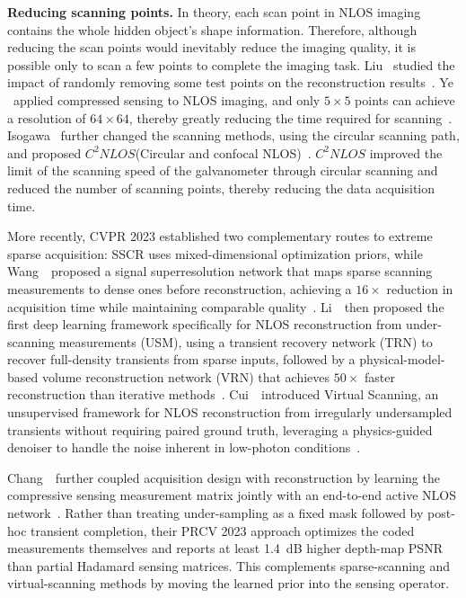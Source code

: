\vspace{0.8mm}
\noindent \textbf{Reducing scanning points.}
In theory, each scan point in NLOS imaging contains the whole hidden object's shape information. Therefore, although reducing the scan points would inevitably reduce the imaging quality, it is possible only to scan a few points to complete the imaging task. Liu \etal~studied the impact of randomly removing some test points on the reconstruction results~\cite{liuRoleWignerDistribution2020}. Ye \etal~applied compressed sensing to NLOS imaging, and only $5\times 5$ points can achieve a resolution of $64\times 64$,  thereby greatly reducing the time required for scanning~\cite{yeCompressedSensingActive2021}. Isogawa \etal~further changed the scanning methods, using the circular scanning path, and proposed $C^2NLOS$(Circular and confocal NLOS)~\cite{isogawaEfficientNonLineofSightImaging}. $C^2NLOS$ improved the limit of the scanning speed of the galvanometer through circular scanning and reduced the number of scanning points, thereby reducing the data acquisition time.

More recently, CVPR 2023 established two complementary routes to extreme sparse acquisition: SSCR uses mixed-dimensional optimization priors, while Wang~\etal~proposed a signal superresolution network that maps sparse scanning measurements to dense ones before reconstruction, achieving a $16\times$ reduction in acquisition time while maintaining comparable quality~\cite{liuFewShotSSCR2022,wangSignalSuperresolution2023}. Li~\etal~then proposed the first deep learning framework specifically for NLOS reconstruction from under-scanning measurements (USM), using a transient recovery network (TRN) to recover full-density transients from sparse inputs, followed by a physical-model-based volume reconstruction network (VRN) that achieves $50\times$ faster reconstruction than iterative methods~\cite{liDeepUnderscanning2023}. Cui~\etal~introduced Virtual Scanning, an unsupervised framework for NLOS reconstruction from irregularly undersampled transients without requiring paired ground truth, leveraging a physics-guided denoiser to handle the noise inherent in low-photon conditions~\cite{cuiVirtualScanning2024}.

Chang~\etal~further coupled acquisition design with reconstruction by learning the compressive sensing measurement matrix jointly with an end-to-end active NLOS network~\cite{changLearnedCompressedNLOS2023}. Rather than treating under-sampling as a fixed mask followed by post-hoc transient completion, their PRCV 2023 approach optimizes the coded measurements themselves and reports at least 1.4~dB higher depth-map PSNR than partial Hadamard sensing matrices. This complements sparse-scanning and virtual-scanning methods by moving the learned prior into the sensing operator.

